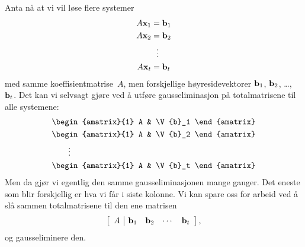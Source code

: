 Anta nå at vi vil løse flere systemer
\begin{align*}
A \mathbf{x}_1 &= \mathbf{b}_1 \\
A \mathbf{x}_2 &= \mathbf{b}_2 \\
          &\ \ \vdots \\
A \mathbf{x}_t &= \mathbf{b}_t
\end{align*}
med samme koeffisientmatrise~$A$, men forskjellige høyresidevektorer
$\mathbf{b}_1$, $\mathbf{b}_2$, \ldots, $\mathbf{b}_t$.  Det kan vi selvsagt gjøre
ved å utføre gausseliminasjon på totalmatrisene til alle systemene:
\begin{align*}
& \begin{amatrix}{1} A & \V{b}_1 \end{amatrix} \\
& \begin{amatrix}{1} A & \V{b}_2 \end{amatrix} \\
& \qquad\vdots \\
& \begin{amatrix}{1} A & \V{b}_t \end{amatrix}
\end{align*}
Men da gjør vi egentlig den samme gausseliminasjonen mange ganger.
Det eneste som blir forskjellig er hva vi får i siste kolonne.  Vi kan
spare oss for arbeid ved å slå sammen totalmatrisene til den ene
matrisen
\[
\left[
\begin{array}{c|cccc} A & \mathbf{b}_1 & \mathbf{b}_2 & \cdots & \mathbf{b}_t \end{array}
\right],
\]
og gausseliminere den.

